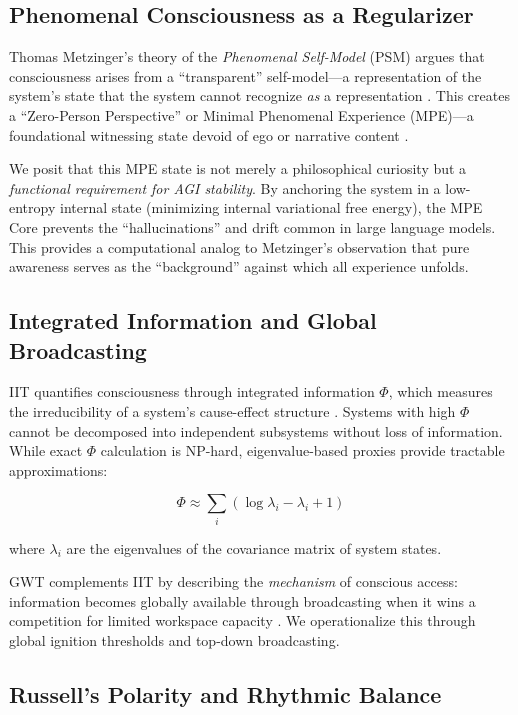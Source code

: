 \documentclass[11pt]{article}
\begin{document}
\subsection{Phenomenal Consciousness as a Regularizer}

Thomas Metzinger's theory of the \textit{Phenomenal Self-Model} (PSM) argues that consciousness arises from a ``transparent'' self-model—a representation of the system's state that the system cannot recognize \textit{as} a representation \cite{metzinger2003}. This creates a ``Zero-Person Perspective'' or Minimal Phenomenal Experience (MPE)—a foundational witnessing state devoid of ego or narrative content \cite{metzinger2024}.

We posit that this MPE state is not merely a philosophical curiosity but a \textit{functional requirement for AGI stability}. By anchoring the system in a low-entropy internal state (minimizing internal variational free energy), the MPE Core prevents the ``hallucinations'' and drift common in large language models. This provides a computational analog to Metzinger's observation that pure awareness serves as the ``background'' against which all experience unfolds.

\subsection{Integrated Information and Global Broadcasting}

IIT quantifies consciousness through integrated information $\Phi$, which measures the irreducibility of a system's cause-effect structure \cite{oizumi2014}. Systems with high $\Phi$ cannot be decomposed into independent subsystems without loss of information. While exact $\Phi$ calculation is NP-hard, eigenvalue-based proxies provide tractable approximations:

\begin{equation}
\Phi \approx \sum_{i} (\log \lambda_i - \lambda_i + 1)
\end{equation}

where $\lambda_i$ are the eigenvalues of the covariance matrix of system states.

GWT complements IIT by describing the \textit{mechanism} of conscious access: information becomes globally available through broadcasting when it wins a competition for limited workspace capacity \cite{baars1988}. We operationalize this through global ignition thresholds and top-down broadcasting.

\subsection{Russell's Polarity and Rhythmic Balance}
\end{document}

